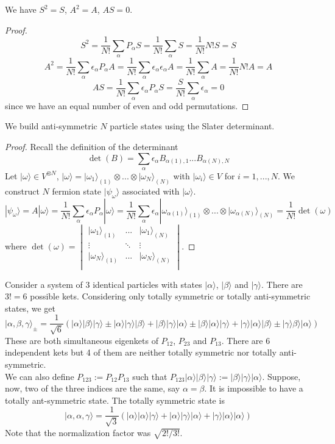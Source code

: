 \documentclass[a4paper]{article}
\begin{document}
\begin{cor}
We have $S^2=S$, $A^2=A$, $AS=0$.
\end{cor}
\begin{proof}
$$S^2=\frac{1}{N!}\sum_\alpha P_\alpha S=\frac{1}{N!}\sum_\alpha S=\frac{1}{N!}N!S=S$$
$$A^2=\frac{1}{N!}\sum_\alpha\epsilon_\alpha P_\alpha A=\frac{1}{N!}\sum_\alpha\epsilon_\alpha\epsilon_\alpha A=\frac{1}{N!}\sum_\alpha A=\frac{1}{N!}N!A=A$$
$$AS=\frac{1}{N!}\sum_\alpha\epsilon_\alpha P_\alpha S=\frac{S}{N!}\sum_\alpha\epsilon_\alpha=0$$
since we have an equal number of even and odd permutations.
\end{proof}
\begin{thm}
We build anti-symmetric $N$ particle states using the Slater determinant.
\end{thm}
\begin{proof}
Recall the definition of the determinant
$$\det(B)=\sum_\alpha\epsilon_\alpha B_{\alpha(1),1}...B_{\alpha(N),N}$$
Let $|\omega\rangle\in V^{\otimes N}$, $|\omega\rangle=|\omega_1\rangle_{(1)}\otimes...\otimes|\omega_N\rangle_{(N)}$ with $|\omega_i\rangle\in V$ for $i=1,...,N$. We construct $N$ fermion state $|\psi_\omega\rangle$ associated with $|\omega\rangle$.
$$|\psi_\omega\rangle=A|\omega\rangle=\frac{1}{N!}\sum_\alpha\epsilon_\alpha P_\alpha|\omega\rangle=\frac{1}{N!}\sum_\alpha\epsilon_\alpha|\omega_{\alpha(1)}\rangle_{(1)}\otimes...\otimes|\omega_{\alpha(N)}\rangle_{(N)}=\frac{1}{N!}\det(\omega)$$
where $\det(\omega)=\begin{vmatrix}|\omega_1\rangle_{(1)}&...&|\omega_1\rangle_{(N)}\\\vdots&\ddots&\vdots\\|\omega_N\rangle_{(1)}&...&|\omega_N\rangle_{(N)}\\\end{vmatrix}$.
\end{proof}
\begin{eg}
Consider a system of 3 identical particles with states $|\alpha\rangle$, $|\beta\rangle$ and $|\gamma\rangle$. There are $3!=6$ possible kets. Considering only totally symmetric or totally anti-symmetric states, we get
$$|\alpha,\beta,\gamma\rangle_\pm=\frac{1}{\sqrt{6}}(|\alpha\rangle|\beta\rangle|\gamma\rangle\pm|\alpha\rangle|\gamma\rangle|\beta\rangle+|\beta\rangle|\gamma\rangle|\alpha\rangle\pm|\beta\rangle|\alpha\rangle|\gamma\rangle+|\gamma\rangle|\alpha\rangle|\beta\rangle\pm|\gamma\rangle\beta\rangle|\alpha\rangle)$$
These are both simultaneous eigenkets of $P_{12}$, $P_{23}$ and $P_{13}$. There are 6 independent kets but 4 of them are neither totally symmetric nor totally anti-symmetric.\\[5pt]
We can also define $P_{123}:=P_{12}P_{13}$ such that $P_{123}|\alpha\rangle|\beta\rangle|\gamma\rangle:=|\beta\rangle|\gamma\rangle|\alpha\rangle$. Suppose, now, two of the three indices are the same, say $\alpha=\beta$. It is impossible to have a totally ant-symmetric state. The totally symmetric state is
$$|\alpha,\alpha,\gamma\rangle=\frac{1}{\sqrt{3}}(|\alpha\rangle|\alpha\rangle|\gamma\rangle+|\alpha\rangle|\gamma\rangle|\alpha\rangle+|\gamma\rangle|\alpha\rangle|\alpha\rangle)$$
Note that the normalization factor was $\sqrt{2!/3!}$.
\end{eg}
\end{document}
